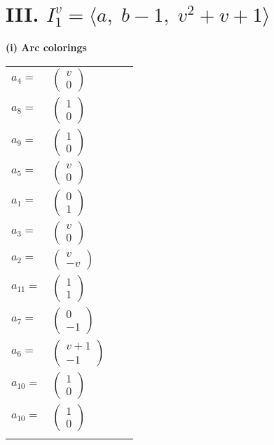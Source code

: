 \documentclass[1p]{elsarticle_modified}
\theoremstyle{definition}
\begin{document}
\centering \section*{III. $I^v_{1}= \langle a,\;b-1,\;v^2+v+1 \rangle$}
\flushleft \textbf{(i) Arc colorings}\\
\begin{tabular}{m{7pt} m{180pt} m{7pt} m{180pt} }
\flushright $a_{4}=$&$\begin{pmatrix}v\\0\end{pmatrix}$ \\
\flushright $a_{8}=$&$\begin{pmatrix}1\\0\end{pmatrix}$ \\
\flushright $a_{9}=$&$\begin{pmatrix}1\\0\end{pmatrix}$ \\
\flushright $a_{5}=$&$\begin{pmatrix}v\\0\end{pmatrix}$ \\
\flushright $a_{1}=$&$\begin{pmatrix}0\\1\end{pmatrix}$ \\
\flushright $a_{3}=$&$\begin{pmatrix}v\\0\end{pmatrix}$ \\
\flushright $a_{2}=$&$\begin{pmatrix}v\\- v\end{pmatrix}$ \\
\flushright $a_{11}=$&$\begin{pmatrix}1\\1\end{pmatrix}$ \\
\flushright $a_{7}=$&$\begin{pmatrix}0\\-1\end{pmatrix}$ \\
\flushright $a_{6}=$&$\begin{pmatrix}v+1\\-1\end{pmatrix}$ \\
\flushright $a_{10}=$&$\begin{pmatrix}1\\0\end{pmatrix}$\\ \flushright $a_{10}=$&$\begin{pmatrix}1\\0\end{pmatrix}$\\&\end{tabular}
\end{document}
